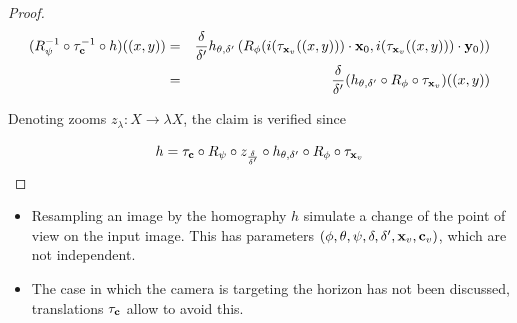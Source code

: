 \begin{proof}
\begin{eqnarray*}
(R_{\psi}^{-1} \circ \tau_{\mathbf{c}}^{-1} \circ h)((x,y)) &=& \frac{\delta}{\delta'}h_{\theta,\delta'}\left ( R_{\phi}(i(\tau_{\mathbf{x}_v}((x,y))) \cdot \mathbf{x}_{0}, i(\tau_{\mathbf{x}_v}((x,y))) \cdot \mathbf{y}_{0})\right)\\
                                               &=&\frac{\delta}{\delta'} (h_{\theta,\delta'}\circ R_{\phi} \circ \tau_{\mathbf{x}_v})((x,y))
\end{eqnarray*}

Denoting zooms $z_{\lambda}:X\rightarrow \lambda X$, the claim is verified since

\begin{equation*}
h = \tau_{\mathbf{c}} \circ R_{\psi} \circ z_{\frac{\delta}{\delta'}} \circ h_{\theta,\delta'} \circ R_{\phi} \circ \tau_{\mathbf{x}_v}
\end{equation*}

\end{proof}


\begin{remarques}
\begin{itemize}
\item Resampling an image by the homography $h$ simulate a change of the point of view on the input image. This has parameters $(\phi,\theta,\psi,\delta,\delta',\mathbf{x}_v,\mathbf{c}_v)$, which are not independent.
\item The case in which the camera is targeting the horizon has not been discussed, translations $\tau_{\mathbf{c}}$ allow to avoid this.
\end{itemize}
\end{remarques}




